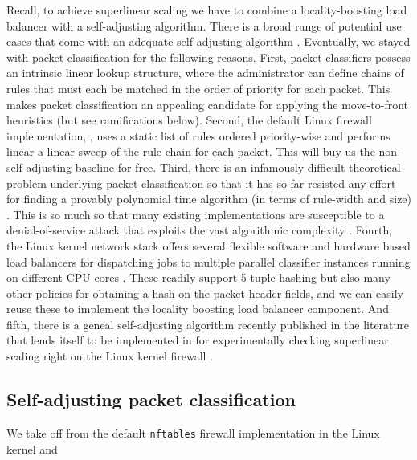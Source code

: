 Recall, to achieve superlinear scaling we have to combine a locality-boosting load balancer with a self-adjusting algorithm. There is a broad range of potential use cases that come with an adequate self-adjusting algorithm \cite{SleatorT85Splay, BentleyCL93, HesterH85, HesterH85, BentleySTW86, Avin0020, ParkM12}. Eventually, we stayed with packet classification for the following reasons. First, packet classifiers possess an intrinsic linear lookup structure, where the administrator can define chains of rules that must each be matched in the order of priority for each packet. This makes packet classification an appealing candidate for applying the move-to-front heuristics (but see ramifications below). Second, the default Linux firewall implementation, \nftables, uses a static list of rules ordered priority-wise and performs linear a linear sweep of the rule chain for each packet. This will buy us the non-self-adjusting baseline for free. Third, there is an infamously difficult theoretical problem underlying packet classification \cite{10.1145/2619239.2626294,10.1006/jagm.1996.0063} so that it has so far resisted any effort for finding a provably polynomial time algorithm (in terms of rule-width and size) \cite{PacutVAPRS2022, 10.1145/2619239.2626294, 10.1145/1851182.1851208, 10.1145/863955.863980, gupta2001algorithms}. This is so much so that many existing implementations \cite{Srinivasan1999,188960} are susceptible to a denial-of-service attack that exploits the vast algorithmic complexity \cite{10.1145/3359989.3365431}. Fourth, the Linux kernel network stack offers several flexible software and hardware based load balancers for dispatching jobs to multiple parallel classifier instances running on different CPU cores \cite{rss-linux}. These readily support 5-tuple hashing but also many other policies for obtaining a hash on the packet header fields, and we can easily reuse these to implement the locality boosting load balancer component. And fifth, there is a geneal self-adjusting algorithm recently published in the literature that lends itself to be implemented in \nftables for experimentally checking superlinear scaling right on the Linux kernel firewall \cite{10228937}.

\subsection{Self-adjusting packet classification}
\label{sec:sa-pack-class}

We take off from the default \texttt{nftables} firewall implementation in the Linux kernel and 

